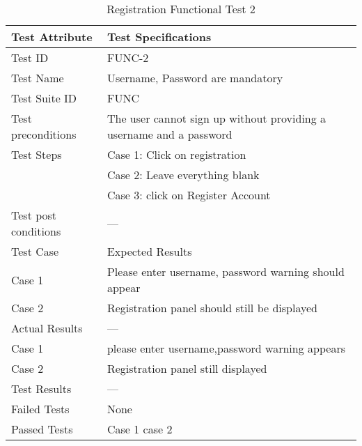 \documentclass{article}
\begin{document}
\begin{table}[htbp]
\begin{center}
\begin{tabular}{|l | l|}
\hline
Test Attribute & Test Specifications \\
\hline
Test ID & FUNC-2 \\
\hline
Test Name  & Username, Password are mandatory \\
\hline
Test Suite  ID & FUNC \\
\hline
Test preconditions & The user cannot sign up without providing a username and a password \\
\hline
Test Steps & Case 1: Click on registration \\
\hline
  & Case 2: Leave everything blank  \\
\hline
  & Case 3: click on Register Account \\
\hline
Test post conditions & --- \\
\hline
Test Case & Expected Results\\
\hline
Case 1  &  Please enter username, password warning should appear  \\
\hline
Case 2 &  Registration panel should still be displayed  \\
\hline
Actual Results & ---\\
\hline
Case 1  &  please enter username,password warning appears  \\
\hline
  Case 2 &  Registration panel still displayed  \\
\hline
Test Results & ---\\
\hline
Failed Tests & None\\
\hline
Passed Tests & Case 1 case 2\\
\hline
\end{tabular}
\end{center}
\caption{Registration Functional Test 2}
\end{table}
\label{table:2b}
\end{document}
